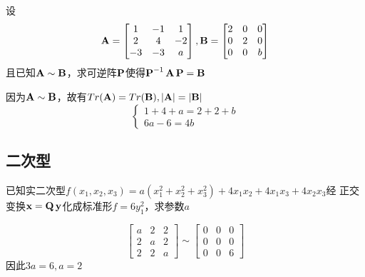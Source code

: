 \documentclass{article}
\begin{document}
\begin{examplle}[]
设
\begin{equation*}
\operatorname{\textbf{A}}=
\begin{bmatrix}
1&-1&1\\2&4&-2\\-3&-3&a
\end{bmatrix},
\operatorname{\textbf{B}}=
\begin{bmatrix}
2&0&0\\
0&2&0\\
0&0&b
\end{bmatrix}
\end{equation*}
且已知\(\operatorname{\textbf{A}}\sim\operatorname{\textbf{B}}\)，求可逆阵\(\operatorname{\textbf{P}}\)使得\(\operatorname{\textbf{P}}^{-1}\operatorname{\textbf{A}}\operatorname{\textbf{P}}=\operatorname{\textbf{B}}\)

因为\(\operatorname{\textbf{A}}\sim\operatorname{\textbf{B}}\)，故有\(Tr(\bA)=Tr(\bB),\abs{\bA}=\abs{\bB}\)
\begin{equation*}
\begin{cases}
1+4+a=2+2+b\\
6a-6=4b
\end{cases}
\end{equation*}
\end{examplle}
\subsection{二次型}
\label{sec:org08b11c8}



\begin{examplle}[]
已知实二次型\(f(x_1,x_2,x_3)=a(x_1^2+x_2^2+x_3^2)+4x_1x_2+4x_1x_3+4x_2x_3\)经
正交变换\(\operatorname{\textbf{x}}=\operatorname{\textbf{Q}}\operatorname{\textbf{y}}\)化成标准形\(f=6y_1^2\)，求参数\(a\)

\begin{equation*}
\begin{bmatrix}
a&2&2\\
2&a&2\\
2&2&a
\end{bmatrix}\sim
\begin{bmatrix}
0&0&0\\
0&0&0\\
0&0&6
\end{bmatrix}
\end{equation*}
因此\(3a=6,a=2\)
\end{examplle}
\end{document}
